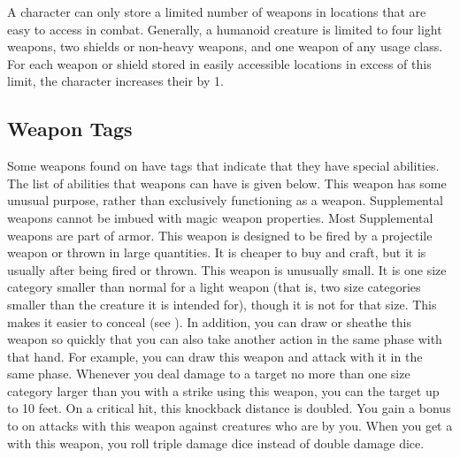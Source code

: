         A character can only store a limited number of weapons in locations that are easy to access in combat.
        Generally, a humanoid creature is limited to four light weapons, two shields or non-heavy weapons, and one weapon of any usage class.
        For each weapon or shield stored in easily accessible locations in excess of this limit, the character increases their  by 1.

    \subsection{Weapon Tags}\label{Weapon Tags}
        Some weapons found on  have tags that indicate that they have special abilities. The list of abilities that weapons can have is given below.
         This weapon has some unusual purpose, rather than exclusively functioning as a weapon.
        Supplemental weapons cannot be imbued with magic weapon properties.
        Most Supplemental weapons are part of armor.
         This weapon is designed to be fired by a projectile weapon or thrown in large quantities.
        It is cheaper to buy and craft, but it is usually  after being fired or thrown.
         This weapon is unusually small.
        It is one size category smaller than normal for a light weapon (that is, two size categories smaller than the creature it is intended for), though it is not  for that size.
        This makes it easier to conceal (see ).
        In addition, you can draw or sheathe this weapon so quickly that you can also take another action in the same phase with that hand.
        For example, you can draw this weapon and attack with it in the same phase.
         Whenever you deal damage to a target no more than one size category larger than you with a strike using this weapon, you can  the target up to 10 feet.
        On a critical hit, this knockback distance is doubled.
         You gain a  bonus to  on  attacks with this weapon against creatures who are \grappled by you.
         When you get a  with this weapon, you roll triple damage dice instead of double damage dice.

